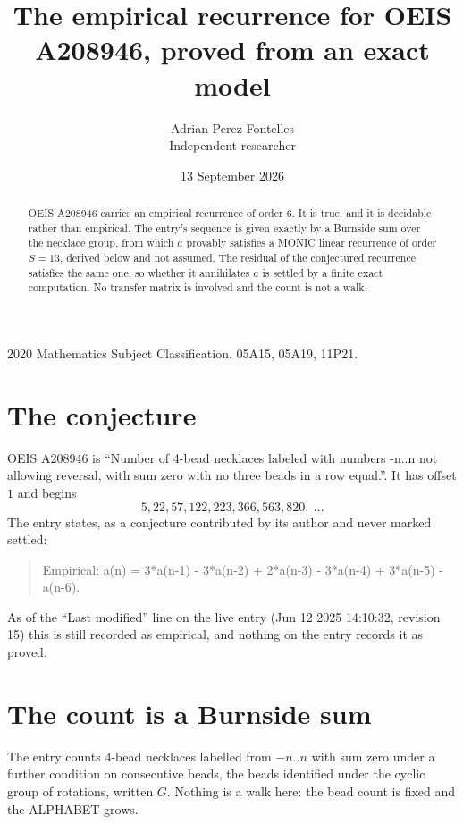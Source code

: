 \documentclass[11pt,a4paper]{article}
\title{The empirical recurrence for OEIS A208946, proved from an exact model}
\author{Adrian Perez Fontelles\\ \small Independent researcher}
\date{13 September 2026}
\theoremstyle{plain}
\theoremstyle{definition}
\begin{document}
\maketitle

\begin{abstract}
OEIS A208946 carries an empirical recurrence of order $6$. It is true, and it is
decidable rather than empirical. The entry's sequence is given exactly by a Burnside sum over the necklace group, from
which $a$ provably satisfies a MONIC linear recurrence of order $S=13$, derived below and not
assumed. The residual of the conjectured recurrence satisfies the same one, so whether it
annihilates $a$ is settled by a finite exact computation. No transfer matrix is involved and
the count is not a walk.
\end{abstract}

\noindent\small 2020 Mathematics Subject Classification. 05A15, 05A19, 11P21.\normalsize

\section{The conjecture}

OEIS A208946 is ``Number of 4-bead necklaces labeled with numbers -n..n not allowing reversal, with sum zero with no three beads in a row equal.''. It has offset $1$ and begins
\[
5, 22, 57, 122, 223, 366, 563, 820,\ \dots
\]
The entry states, as a conjecture contributed by its author and never marked settled:
\begin{quote}
Empirical: a(n) = 3*a(n-1) - 3*a(n-2) + 2*a(n-3) - 3*a(n-4) + 3*a(n-5) - a(n-6).
\end{quote}
As of the ``Last modified'' line on the live entry (Jun 12 2025 14:10:32, revision 15)
this is still recorded as empirical, and nothing on the entry records it as proved.

\section{The count is a Burnside sum}

The entry counts $4$-bead necklaces labelled from $-n..n$ with sum zero under a further
condition on consecutive beads, the beads identified under the cyclic group of rotations, written $G$. Nothing is a
walk here: the bead count is fixed and the ALPHABET grows.
\end{document}
